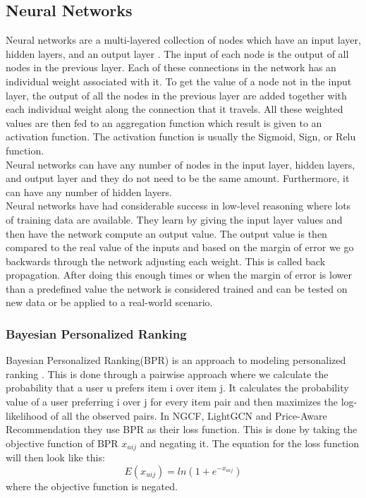 \subsection{Neural Networks}
Neural networks are a multi-layered collection of nodes which have an input layer, hidden layers, and an output layer \cite{AI-book}.
The input of each node is the output of all nodes in the previous layer.
Each of these connections in the network has an individual weight associated with it.
To get the value of a node not in the input layer, the output of all the nodes in the previous layer are added together with each individual weight along the connection that it travels.
All these weighted values are then fed to an aggregation function which result is given to an activation function.
The activation function is usually the Sigmoid, Sign, or Relu function.
\\
Neural networks can have any number of nodes in the input layer, hidden layers, and output layer and they do not need to be the same amount.
Furthermore, it can have any number of hidden layers.
\\
Neural networks have had considerable success in low-level reasoning where lots of training data are available.
They learn by giving the input layer values and then have the network compute an output value.
The output value is then compared to the real value of the inputs and based on the margin of error we go backwards through the network adjusting each weight.
This is called back propagation.
After doing this enough times or when the margin of error is lower than a predefined value the network is considered trained and can be tested on new data or be applied to a real-world scenario.

\subsubsection{Bayesian Personalized Ranking}
Bayesian Personalized Ranking(BPR) is an approach to modeling personalized ranking \cite{BPR}.
This is done through a pairwise approach where we calculate the probability that a user u prefers item i over item j.
It calculates the probability value of a user preferring i over j for every item pair and then maximizes the log-likelihood of all the observed pairs.
In NGCF, LightGCN and Price-Aware Recommendation they use BPR as their loss function.
This is done by taking the objective function of BPR $x_{uij}$ and negating it.
The equation for the loss function will then look like this:
\[E(x_{uij}) = ln(1+e^{-x_{uij}})\]
where the objective function is negated.

